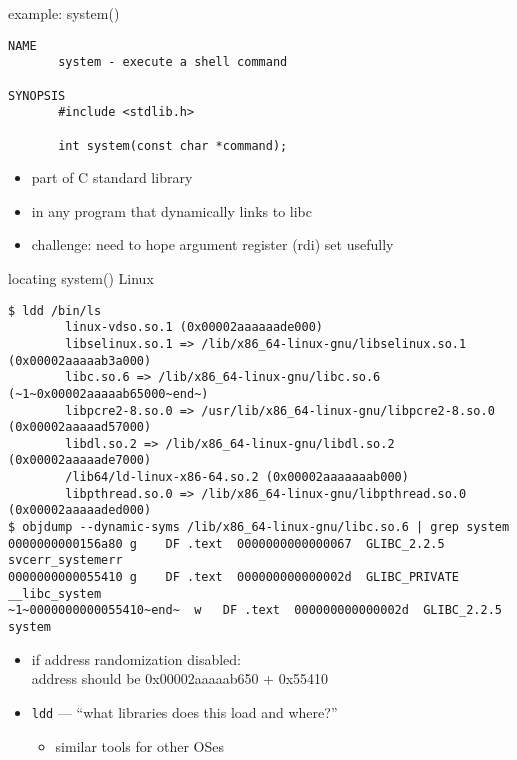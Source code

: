 \begin{frame}[fragile,label=systemFunc]{example: system()}
\begin{lstlisting}[language={}]
NAME
       system - execute a shell command

SYNOPSIS
       #include <stdlib.h>

       int system(const char *command);
\end{lstlisting}
\begin{itemize}
\item part of C standard library
\item in any program that dynamically links to libc
\item challenge: need to hope argument register (rdi) set usefully
\end{itemize}
\end{frame}

\begin{frame}[fragile,label=locateSystem]{locating system() Linux}
\begin{lstlisting}[language={},style=script,
moredelim={**[is][\btHL<1>]{~1~}{~end~}},
]
$ ldd /bin/ls
        linux-vdso.so.1 (0x00002aaaaaade000)
        libselinux.so.1 => /lib/x86_64-linux-gnu/libselinux.so.1 (0x00002aaaaab3a000)
        libc.so.6 => /lib/x86_64-linux-gnu/libc.so.6 (~1~0x00002aaaaab65000~end~)
        libpcre2-8.so.0 => /usr/lib/x86_64-linux-gnu/libpcre2-8.so.0 (0x00002aaaaad57000)
        libdl.so.2 => /lib/x86_64-linux-gnu/libdl.so.2 (0x00002aaaaade7000)
        /lib64/ld-linux-x86-64.so.2 (0x00002aaaaaaab000)
        libpthread.so.0 => /lib/x86_64-linux-gnu/libpthread.so.0 (0x00002aaaaaded000)
$ objdump --dynamic-syms /lib/x86_64-linux-gnu/libc.so.6 | grep system
0000000000156a80 g    DF .text  0000000000000067  GLIBC_2.2.5 svcerr_systemerr
0000000000055410 g    DF .text  000000000000002d  GLIBC_PRIVATE __libc_system
~1~0000000000055410~end~  w   DF .text  000000000000002d  GLIBC_2.2.5 system
\end{lstlisting}
\begin{itemize}
\item if address randomization disabled: \\
address should be 0x00002aaaaab650 + 0x55410
\vspace{.5cm}
\item \texttt{ldd} --- ``what libraries does this load and where?''
    \begin{itemize}
    \item similar tools for other OSes
    \end{itemize}
\end{itemize}
\end{frame}
